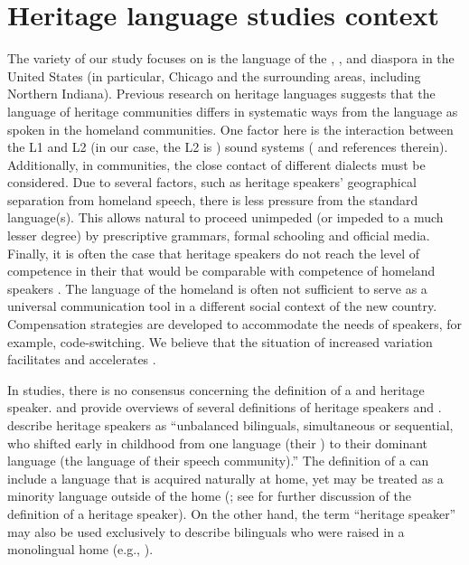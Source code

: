 \documentclass[output=paper,modfonts,newtxmath,hidelinks,]{langscibook}
\begin{document}
\section{Heritage language studies context}\label{sec:mihajlovic:2}

The variety of  our study focuses on is the language of the , , and  diaspora in the United States (in particular, Chicago and the surrounding areas, including Northern Indiana). Previous research on heritage languages suggests that the language of heritage communities differs in systematic ways from the language as spoken in the homeland communities. One factor here is the interaction between the L1 and L2 (in our case, the L2 is ) sound systems (\citealt{Polinsky2018} and references therein). Additionally, in  communities, the close contact of different dialects must be considered. Due to several factors, such as heritage speakers’ geographical separation from homeland speech, there is less pressure from the standard language(s). This allows natural  to proceed unimpeded (or impeded to a much lesser degree) by prescriptive grammars, formal schooling and official media. Finally, it is often the case that heritage speakers do not reach the level of competence in their  that would be comparable with competence of homeland speakers \citep{Scontras-etal2015}. The language of the homeland is often not sufficient to serve as a universal communication tool in a different social context of the new country. Compensation strategies are developed to accommodate the needs of speakers, for example, code-switching. We believe that the situation of increased variation facilitates and accelerates .



In  studies, there is no consensus concerning the definition of a  and heritage speaker. \citet{Polinsky2018} and \citet{Kelleher2010} provide overviews of several definitions of heritage speakers and . \citet[1]{Scontras-etal2015} describe heritage speakers as “unbalanced bilinguals, simultaneous or sequential, who shifted early in childhood from one language (their ) to their dominant language (the language of their speech community).” The definition of a  can include a language that is acquired naturally at home, yet may be treated as a minority language outside of the home (\citealt{Polinsky2018}; see \citealt{Kupisch-etal2014} for further discussion of the definition of a heritage speaker). On the other hand, the term “heritage speaker” may also be used exclusively to describe bilinguals who were raised in a monolingual home (e.g., \citealt{Polinsky-Kagan2007}).
\end{document}
